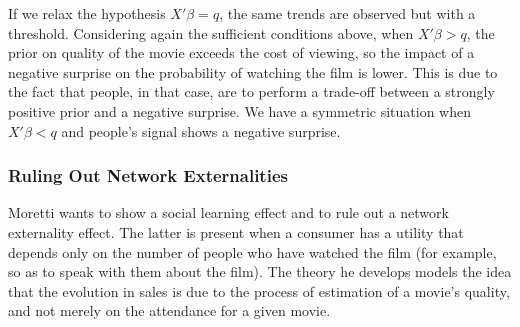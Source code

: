 	If we relax the hypothesis $X'\beta=q$, the same trends are observed but with a threshold. Considering again the sufficient conditions above, when $X'\beta>q$, the prior on quality of the movie exceeds the cost of viewing, so the impact of a negative surprise on the probability of watching the film is lower. This is due to the fact that people, in that case, are to perform a trade-off between a strongly positive prior and a negative surprise. We have a symmetric situation when $X'\beta<q$ and people's signal shows a negative surprise.
	
	\subsubsection{Ruling Out Network Externalities}

	Moretti wants to show a social learning effect and to rule out a network externality effect. The latter is present when a consumer has a utility that depends only on the number of people who have watched the film (for example, so as to speak with them about the film). The theory he develops models the idea that the evolution in sales is due to the process of estimation of a movie's quality, and not merely on the attendance for a given movie.
